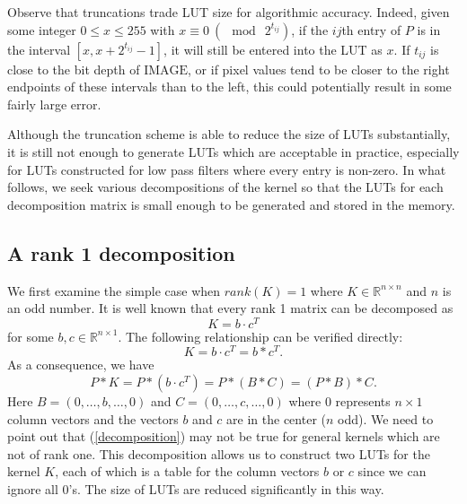 \documentclass[12pt]{amsart}
\theoremstyle{definition}
\theoremstyle{remark}
\numberwithin{thm}{section}
\begin{document}
Observe that truncations trade LUT size for algorithmic accuracy. Indeed, given some integer $0\le x\le 255$ with $x \equiv 0\ (\!\!\!\mod\ 2^{t_{ij}})$, if the $ij$th entry of $P$ is in the interval $[x,x+2^{t_{ij}}-1]$, it will still be entered into the LUT as $x$. If $t_{ij}$ is close to the bit depth of $\text{IMAGE}$, or if pixel values tend to be closer to the right endpoints of these intervals than to the left, this could potentially result in some fairly large error. 

Although the truncation scheme is able to reduce the size of LUTs substantially, it is still not enough to generate LUTs which are acceptable in practice, especially for LUTs constructed for low pass filters where every entry is non-zero. In what follows, we seek various decompositions of the kernel so that the LUTs for each decomposition matrix is small enough to be generated and stored in the memory. 

\subsection{A rank 1 decomposition}\label{rank 1 decomposition}

We first examine the simple case when $rank(K)=1$ where $K\in \mathbb{R}^{n\times n}$ and $n$ is an odd number. It is well known that every rank 1 matrix can be decomposed as
\[K=b\cdot c^T\]
for some $b,c\in \mathbb{R}^{n\times 1}$. The following relationship can be verified directly: 
\[K=b\cdot c^T=b*c^T.\]
As a consequence, we have 
\begin{equation}\label{decomposition}
P*K=P*(b\cdot c^T)=P*(B*C)=(P*B)*C.
\end{equation}
Here $B=(0,\dots,b,\dots,0)$ and $C=(0,\dots,c,\dots,0)$ where $0$ represents $n\times 1$ column vectors and the vectors $b$ and $c$ are in the center ($n$ odd). We need to point out that (\ref{decomposition}) may not be true for general kernels which are not of rank one. This decomposition allows us to construct two LUTs for the kernel $K$, each of which is a table for the column vectors $b$ or $c$ since we can ignore all $0$'s. The size of LUTs are reduced significantly in this way.
\end{document}
